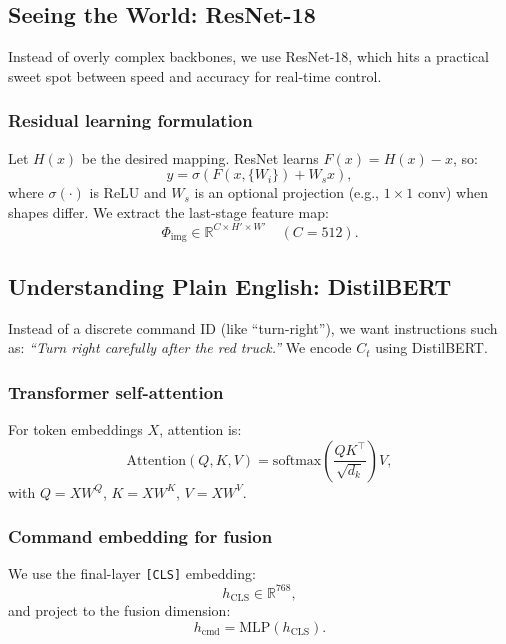 \documentclass[11pt]{article}
\begin{document}
\subsection{Seeing the World: ResNet-18}

Instead of overly complex backbones, we use ResNet-18, which hits a practical sweet spot between speed and accuracy for real-time control.

\subsubsection{Residual learning formulation}
Let $H(x)$ be the desired mapping. ResNet learns $F(x)=H(x)-x$, so:
\begin{equation}
y = \sigma\!\left(F(x,\{W_i\}) + W_s x\right),
\end{equation}
where $\sigma(\cdot)$ is ReLU and $W_s$ is an optional projection (e.g., $1\times 1$ conv) when shapes differ. We extract the last-stage feature map:
\[
\Phi_{\text{img}} \in \mathbb{R}^{C\times H'\times W'} \quad (C=512).
\]

\subsection{Understanding Plain English: DistilBERT}

Instead of a discrete command ID (like ``turn-right''), we want instructions such as:
\emph{``Turn right carefully after the red truck.''}
We encode $C_t$ using DistilBERT.

\subsubsection{Transformer self-attention}
For token embeddings $X$, attention is:
\begin{equation}
\mathrm{Attention}(Q,K,V)=\mathrm{softmax}\!\left(\frac{QK^\top}{\sqrt{d_k}}\right)V,
\end{equation}
with $Q=XW^Q$, $K=XW^K$, $V=XW^V$.

\subsubsection{Command embedding for fusion}
We use the final-layer \texttt{[CLS]} embedding:
\[
h_{\text{CLS}} \in \mathbb{R}^{768},
\]
and project to the fusion dimension:
\begin{equation}
h_{\text{cmd}}=\mathrm{MLP}(h_{\text{CLS}}).
\end{equation}
\end{document}

